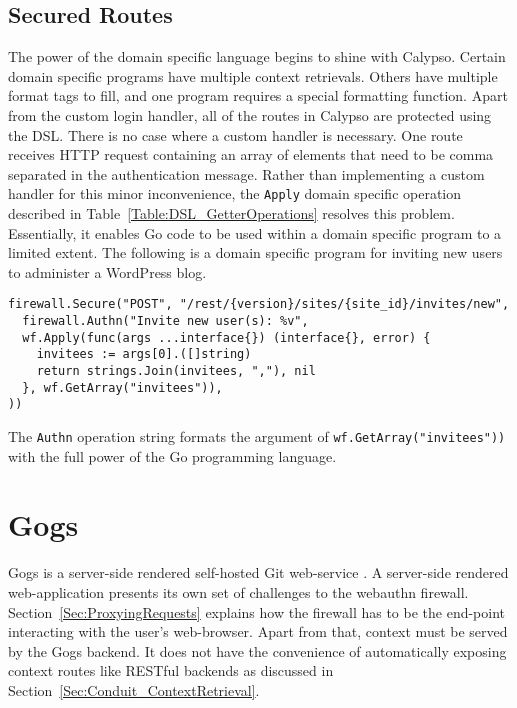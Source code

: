 \subsection{Secured Routes}\label{Sec:CalypsoSecuredRoutes}

The power of the domain specific language begins to shine with Calypso. Certain domain specific programs have multiple context retrievals. Others have multiple format tags to fill, and one program requires a special formatting function. Apart from the custom login handler, all of the routes in Calypso are protected using the DSL. There is no case where a custom handler is necessary. One route receives HTTP request containing an array of elements that need to be comma separated in the authentication message. Rather than implementing a custom handler for this minor inconvenience, the \lstinline{Apply} domain specific operation described in Table~\ref{Table:DSL_GetterOperations} resolves this problem. Essentially, it enables Go code to be used within a domain specific program to a limited extent. The following is a domain specific program for inviting new users to administer a WordPress blog.

\begin{lstlisting}
firewall.Secure("POST", "/rest/{version}/sites/{site_id}/invites/new", 
  firewall.Authn("Invite new user(s): %v",
  wf.Apply(func(args ...interface{}) (interface{}, error) {
    invitees := args[0].([]string)
    return strings.Join(invitees, ","), nil
  }, wf.GetArray("invitees")),
))
\end{lstlisting}

The \lstinline{Authn} operation string formats the argument of \lstinline{wf.GetArray("invitees"))} with the full power of the Go programming language.

\section{Gogs}

Gogs is a server-side rendered self-hosted Git web-service \cite{TODO-gogs}. A server-side rendered web-application presents its own set of challenges to the webauthn firewall. Section~\ref{Sec:ProxyingRequests} explains how the firewall has to be the end-point interacting with the user's web-browser. Apart from that, context must be served by the Gogs backend. It does not have the convenience of automatically exposing context routes like RESTful backends as discussed in Section~\ref{Sec:Conduit_ContextRetrieval}.

